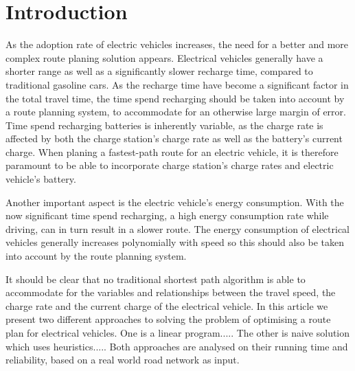 \section{Introduction}

As the adoption rate of electric vehicles increases, the need for a better and more complex route planing solution appears. Electrical vehicles generally have a shorter range as well as a significantly slower recharge time, compared to traditional gasoline cars. As the recharge time have become a significant factor in the total travel time, the time spend recharging should be taken into account by a route planning system, to accommodate for an otherwise large margin of error. Time spend recharging batteries is inherently variable, as the charge rate is affected by both the charge station's charge rate as well as the battery's current charge. When planing a fastest-path route for an electric vehicle, it is therefore paramount to be able to incorporate charge station's charge rates and electric vehicle's battery.

Another important aspect is the electric vehicle's energy consumption. With the now significant time spend recharging, a high energy consumption rate while driving, can in turn result in a slower route. The energy consumption of electrical vehicles generally increases polynomially with speed so this should also be taken into account by the route planning system.

It should be clear that no traditional shortest path algorithm is able to accommodate for the variables and relationships between the travel speed, the charge rate and the current charge of the electrical vehicle. In this article we present two different approaches to solving the problem of optimising a route plan for electrical vehicles. One is a linear program..... The other is naive solution which uses heuristics..... Both approaches are analysed on their running time and reliability, based on a real world road network as input.




